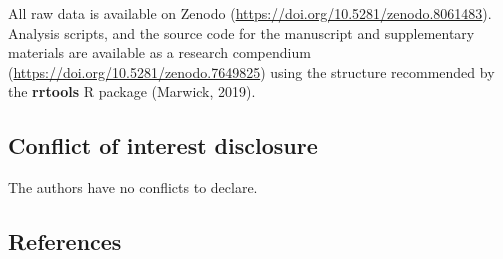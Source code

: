 \documentclass[
]{article}
\begin{document}
All raw data is available on Zenodo
(\url{https://doi.org/10.5281/zenodo.8061483}). Analysis scripts, and
the source code for the manuscript and supplementary materials are
available as a research compendium
(\url{https://doi.org/10.5281/zenodo.7649825}) using the structure
recommended by the \textbf{rrtools} R package (Marwick, 2019).

\hypertarget{conflict-of-interest-disclosure}{%
\subsection*{Conflict of interest
disclosure}\label{conflict-of-interest-disclosure}}

The authors have no conflicts to declare.

\hypertarget{references}{%
\subsection*{References}\label{references}}
\end{document}
